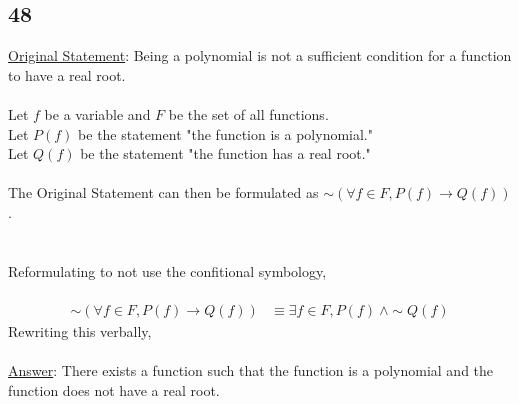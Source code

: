 \documentclass[12pt]{article}
\begin{document}
\subsection*{48}
\underline{Original Statement}: Being a polynomial is not a sufficient condition for a function to have a real root.
\\ \\
Let $f$ be a variable and $F$ be the set of all functions. \\
Let $P(f)$ be the statement "the function is a polynomial." \\
Let $Q(f)$ be the statement "the function has a real root."
\\ \\
The Original Statement can then be formulated as $\sim(\forall f \in F,P(f) \rightarrow Q(f))$. \\
\\ \\
Reformulating to not use the confitional symbology,
\\ \\
\begin{align*}
  \sim(\forall f \in F,P(f) \rightarrow Q(f)) &\equiv \exists f \in F, P(f) \ \wedge \sim Q(f)
\end{align*}
Rewriting this verbally,
\\ \\
\underline{Answer}: There exists a function such that the function is a polynomial and the function does not have a real root. 
\end{document}
